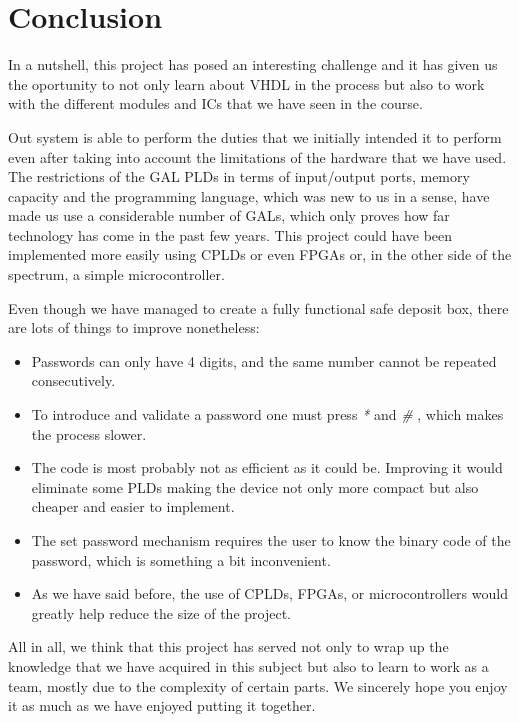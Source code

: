 \section{Conclusion}

In a nutshell, this project has posed an interesting challenge and it has given us the oportunity to not only learn about VHDL in the process but also to work with the different modules and ICs that we have seen in the course.\medskip

Out system is able to perform the duties that we initially intended it to perform even after taking into account the limitations of the hardware that we have used. The restrictions of the GAL PLDs in terms of input/output ports, memory capacity and the programming language, which was new to us in a sense, have made us use a considerable number of GALs, which only proves how far technology has come in the past few years. This project could have been implemented more easily using CPLDs or even FPGAs or, in the other side of the spectrum, a simple microcontroller. \medskip

Even though we have managed to create a fully functional safe deposit box, there are lots of things to improve nonetheless:

\begin{itemize}
    \item Passwords can only have 4 digits, and the same number cannot be repeated consecutively.
    
    \item To introduce and validate a password one must press \textit{*} and \textit{\#} , which makes the process slower.
    
    \item The code is most probably not as efficient as it could be. Improving it would eliminate some PLDs making the device not only more compact but also cheaper and easier to implement.
    
    \item The set password mechanism requires the user to know the binary code of the password, which is something a bit inconvenient.
    
    \item As we have said before, the use of CPLDs, FPGAs, or microcontrollers would greatly help reduce the size of the project.
\end{itemize}


All in all, we think that this project has served not only to wrap up the knowledge that we have acquired in this subject but also to learn to work as a team, mostly due to the complexity of certain parts. We sincerely hope you enjoy it as much as we have enjoyed putting it together. 